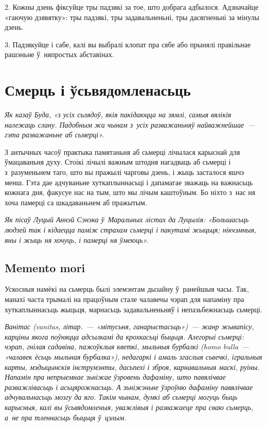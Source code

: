 2. Кожны дзень фіксуйце тры падзякі за тое, што добрага адбылося. Адзначайце «гаючую дзявятку»: тры падзякі, тры задавальненьні, тры дасягненьні за мінулы дзень.

3. Падзякуйце і сабе, калі вы выбралі клопат пра сябе або прынялі правільнае рашэньне ў~няпростых абставінах.


\section{Смерць і ўсьвядомленасьць}

\emph{Як казаў Буда, «з усіх сьлядоў, якія пакідаюцца на зямлі, самыя вялікія належаць слану. Падобным жа чынам з~усіх разважаньняў найважнейшае~--- гэта разважаньне аб сьмерці».}

З антычных часоў практыка памятаньня аб сьмерці лічылася карыснай для ўмацаваньня духу. Стоікі лічылі важным штодня нагадваць аб сьмерці і з~разуменьнем таго, што вы пражылі чарговы дзень, і жыць засталося яшчэ менш. Гэта дае адчуваньне хуткаплыннасьці і дапамагае зважаць на важнасьць кожнага дня, факусуе нас на тым, што мы лічым каштоўным. Бо ніхто з~нас ня хоча памерці са шкадаваньнем аб пражытым.

\emph{Як пісаў Луцый Аннэй Сэнэка ў~Маральных лістах да Луцылія: «Большасьць людзей так і кідаецца паміж страхам сьмерці і пакутамі жыцьця; нікчэмныя, яны і жыць ня хочуць, і памерці ня ўмеюць».}

\subsection*{Memento mori}

Ускосныя намёкі на сьмерць былі элемэнтам дызайну ў~ранейшыя часы. Так, манахі часта трымалі на працоўным стале чалавечы чэрап для напаміну пра хуткаплыннасьць жыцьця, марнасьць задавальненьняў і непазьбежнасьць сьмерці. 

\emph{Ванітас (vanitas, літар.~--- «мітусьня, ганарыстасьць»)~--- жанр жывапісу, карціны якога поўняцца адсылкамі да крохкасьці быцьця. Алегорыі сьмерці: чэрап, гнілая садавіна, пажоўклыя кветкі, мыльныя бурбалкі (homo bulla~--- «чалавек ёсьць мыльная бурбалка»), недагаркі і амаль згаслыя сьвечкі, ігральныя карты, мэдыцынскія інструмэнты, дасьпехі і зброя, карнавальныя маскі, руіны. Напамін пра непрыемнае зьніжае ўзровень дафаміну, што павялічвае разважлівасьць і асьцярожнасьць. А зьніжэньне ўзроўню дафаміну павялічвае адчувальнасьць мозгу да яго. Такім чынам, думкі аб сьмерці могуць быць карысныя, калі вы ўсьвядомленыя, уважлівыя і разважаеце пра сваю сьмерць, а~не пра тленнасьць быцьця ў~цэлым.}

